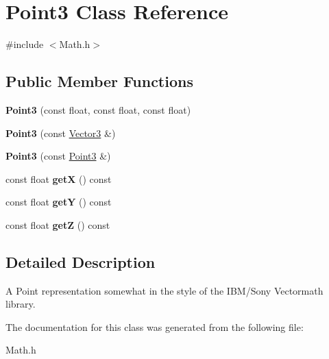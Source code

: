 \hypertarget{classPoint3}{}\section{Point3 Class Reference}
\label{classPoint3}


{\ttfamily \#include $<$Math.\+h$>$}

\subsection*{Public Member Functions}
\begin{DoxyCompactItemize}
\item 
\mbox{\label{classPoint3_ad0f631c28710bdde931c011074a2a68d}} 
{\bfseries Point3} (const float, const float, const float)
\item 
\mbox{\label{classPoint3_aac865c72759af4a8f3001c30396e2e6f}} 
{\bfseries Point3} (const \hyperlink{classVector3}{Vector3} \&)
\item 
\mbox{\label{classPoint3_a626b55d57f4fe011906e0396f4d8cb49}} 
{\bfseries Point3} (const \hyperlink{classPoint3}{Point3} \&)
\item 
\mbox{\label{classPoint3_a50294e5bc4bc610080f3579d35585c01}} 
const float {\bfseries getX} () const
\item 
\mbox{\label{classPoint3_a692237abe7082a313a9fb92c5b7fd0a0}} 
const float {\bfseries getY} () const
\item 
\mbox{\label{classPoint3_a65dacc34c8c27fbef332a1dd77bde119}} 
const float {\bfseries getZ} () const
\end{DoxyCompactItemize}


\subsection{Detailed Description}
A Point representation somewhat in the style of the I\+B\+M/\+Sony Vectormath library. 

The documentation for this class was generated from the following file\+:\begin{DoxyCompactItemize}
\item 
Math.\+h\end{DoxyCompactItemize}
